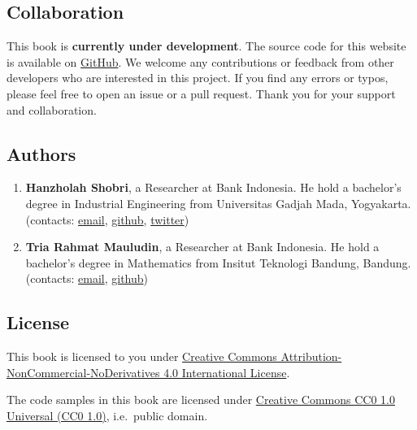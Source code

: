 \documentclass[
  letterpaper,
  DIV=11,
  numbers=noendperiod]{scrreprt}
\begin{document}
\hypertarget{collaboration}{%
\subsection*{Collaboration}\label{collaboration}}

This book is \textbf{currently under development}. The source code for
this website is available on
\href{https://github.com/hanzholahs/tensorflow-for-deep-learning}{GitHub}.
We welcome any contributions or feedback from other developers who are
interested in this project. If you find any errors or typos, please feel
free to open an issue or a pull request. Thank you for your support and
collaboration.

\hypertarget{authors}{%
\subsection*{Authors}\label{authors}}

\begin{enumerate}
\def\labelenumi{\arabic{enumi}.}
\item
  \textbf{Hanzholah Shobri}, a Researcher at Bank Indonesia. He hold a
  bachelor's degree in Industrial Engineering from Universitas Gadjah
  Mada, Yogyakarta. (contacts:
  \href{mailto:hanzholahs@gmail.com}{email},
  \href{https://github.com/hanzholahs}{github},
  \href{https://twitter.com/hanzholah}{twitter})
\item
  \textbf{Tria Rahmat Mauludin}, a Researcher at Bank Indonesia. He hold
  a bachelor's degree in Mathematics from Insitut Teknologi Bandung,
  Bandung. (contacts: \href{mailto:triarahmatm@gmail.com}{email},
  \href{https://github.com/triarm}{github})
\end{enumerate}

\hypertarget{license}{%
\subsection*{License}\label{license}}

This book is licensed to you under
\href{https://creativecommons.org/licenses/by-nc-nd/4.0/}{Creative
Commons Attribution-NonCommercial-NoDerivatives 4.0 International
License}.

The code samples in this book are licensed under
\href{https://creativecommons.org/publicdomain/zero/1.0/}{Creative
Commons CC0 1.0 Universal (CC0 1.0)}, i.e.~public domain.
\end{document}
